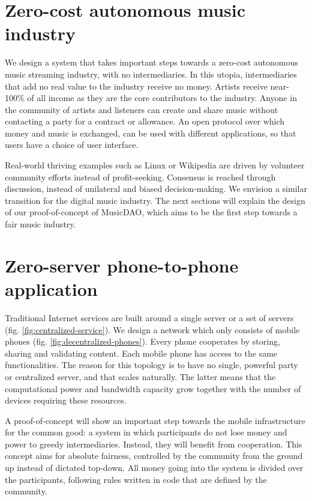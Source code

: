 \section{Zero-cost autonomous music industry}
We design a system that takes important steps towards a zero-cost autonomous music streaming industry, with no intermediaries. In this utopia, intermediaries that add no real value to the industry receive no money. Artists receive near-100\% of all income as they are the core contributors to the industry. Anyone in the community of artists and listeners can create and share music without contacting a party for a contract or allowance. An open protocol over which money and music is exchanged, can be used with different applications, so that users have a choice of user interface. 

Real-world thriving examples such as Linux or Wikipedia are driven by volunteer community efforts instead of profit-seeking. Consensus is reached through discussion, instead of unilateral and biased decision-making. We envision a similar transition for the digital music industry. The next sections will explain the design of our proof-of-concept of MusicDAO, which aims to be the first step towards a fair music industry.

\section{Zero-server phone-to-phone application}
Traditional Internet services are built around a single server or a set of servers (fig. \ref{fig:centralized-service}). We design a network which only consists of mobile phones (fig. \ref{fig:decentralized-phones}). Every phone cooperates by storing, sharing and validating content. Each mobile phone has access to the same functionalities. The reason for this topology is to have no single, powerful party or centralized server, and that scales naturally. The latter means that the computational power and bandwidth capacity grow together with the number of devices requiring these resources.

A proof-of-concept will show an important step towards the mobile infrastructure for the common good: a system in which participants do not lose money and power to greedy intermediaries. Instead, they will benefit from cooperation. This concept aims for absolute fairness, controlled by the community from the ground up instead of dictated top-down. All money going into the system is divided over the participants, following rules written in code that are defined by the community.

